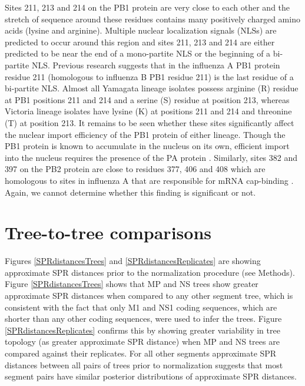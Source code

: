\documentclass[11pt,oneside,letterpaper]{article}
\begin{document}
Sites 211, 213 and 214 on the PB1 protein are very close to each other and the stretch of sequence around these residues contains many positively charged amino acids (lysine and arginine).
Multiple nuclear localization signals (NLSs) are predicted to occur around this region and sites 211, 213 and 214 are either predicted to be near the end of a mono-partite NLS or the beginning of a bi-partite NLS.
Previous research \cite{nath1990} suggests that in the influenza A PB1 protein residue 211 (homologous to influenza B PB1 residue 211) is the last residue of a bi-partite NLS.
Almost all Yamagata lineage isolates possess arginine (R) residue at PB1 positions 211 and 214 and a serine (S) residue at position 213, whereas Victoria lineage isolates have lysine (K) at positions 211 and 214 and threonine (T) at position 213.
It remains to be seen whether these sites significantly affect the nuclear import efficiency of the PB1 protein of either lineage.
Though the PB1 protein is known to accumulate in the nucleus on its own, efficient import into the nucleus requires the presence of the PA protein \cite{fodor2004}.
Similarly, sites 382 and 397 on the PB2 protein are close to residues 377, 406 and 408 which are homologous to sites in influenza A that are responsible for mRNA cap-binding \cite{guilligay2008}.
Again, we cannot determine whether this finding is significant or not.

\section*{Tree-to-tree comparisons}

Figures \ref{SPRdistancesTrees} and \ref{SPRdistancesReplicates} are showing approximate SPR distances prior to the normalization procedure (see Methods).
Figure \ref{SPRdistancesTrees} shows that MP and NS trees show greater approximate SPR distances when compared to any other segment tree, which is consistent with the fact that only M1 and NS1 coding sequences, which are shorter than any other coding sequences, were used to infer the trees.
Figure \ref{SPRdistancesReplicates} confirms this by showing greater variability in tree topology (as greater approximate SPR distance) when MP and NS trees are compared against their replicates.
For all other segments approximate SPR distances between all pairs of trees prior to normalization suggests that most segment pairs have similar posterior distributions of approximate SPR distances.
\end{document}
